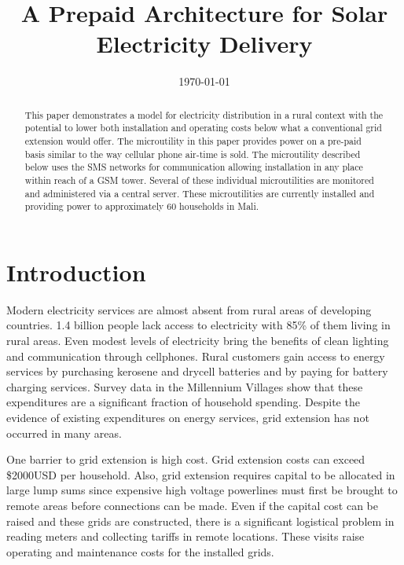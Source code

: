 \documentclass{sig-alternate}
\begin{document}
\title{A Prepaid Architecture for Solar Electricity Delivery}
\date{\today}
\maketitle

\begin{abstract}
This paper demonstrates a model for electricity
distribution in a rural context with the potential
to lower both installation and operating costs below
what a conventional grid extension would offer.
The microutility in this paper provides power on a
pre-paid basis similar to the way cellular phone
air-time is sold.
The microutility described below uses the SMS networks
for communication allowing installation in any place
within reach of a GSM tower.
Several of these individual microutilities are monitored
and administered via a central server.
These microutilities are currently installed and providing
power to approximately 60 households in Mali.
\end{abstract}

\section{Introduction}
Modern electricity services are almost absent from rural
areas of developing countries.
1.4 billion people lack access to electricity with 85\% of
them living in rural areas.\cite{WEO2010}
Even modest levels of electricity bring the benefits of clean lighting
and communication through cellphones.
Rural customers gain access to energy services by purchasing
kerosene and drycell batteries and by paying for battery charging
services.
Survey data in the Millennium Villages show that these expenditures
are a significant fraction of household spending.\cite{MVPEnergy}
Despite the evidence of existing
expenditures on energy services,
grid extension has not occurred in many areas.

One barrier to grid extension is high cost.
Grid extension costs can exceed \$2000USD per household.\cite{ModiPlanningKenya}
Also, grid extension requires capital to be allocated in large
lump sums since expensive high voltage powerlines must first be brought to remote areas
before connections can be made.
Even if the capital cost can be raised and these grids are
constructed, there is a significant
logistical problem in reading meters and collecting tariffs
in remote locations.
These visits raise operating and maintenance costs for the installed grids.
\end{document}
